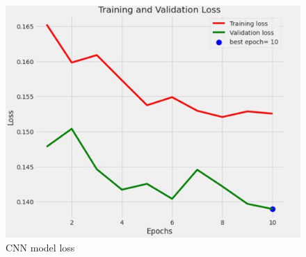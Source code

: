 \documentclass[12pt,a4paper]{report}
\begin{document}
\begin{figure}[htbp]
	\centerline{\includegraphics[scale=0.5]{cnn_loss.jpg}}
	\caption{CNN model loss}
	\label{Cnn_loss}
\end{figure}
\end{document}
